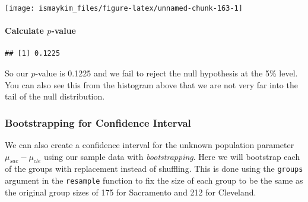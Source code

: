 \documentclass[]{tufte-book}
\newenvironment{Shaded}{\begin{snugshade}}{\end{snugshade}}
\newcommand{\KeywordTok}[1]{\textcolor[rgb]{0.13,0.29,0.53}{\textbf{{#1}}}}
\newcommand{\DataTypeTok}[1]{\textcolor[rgb]{0.13,0.29,0.53}{{#1}}}
\newcommand{\DecValTok}[1]{\textcolor[rgb]{0.00,0.00,0.81}{{#1}}}
\newcommand{\StringTok}[1]{\textcolor[rgb]{0.31,0.60,0.02}{{#1}}}
\newcommand{\OtherTok}[1]{\textcolor[rgb]{0.56,0.35,0.01}{{#1}}}
\newcommand{\NormalTok}[1]{{#1}}
\begin{document}
\begin{center}\texttt{[image: ismaykim\_files/figure-latex/unnamed-chunk-163-1]} \end{center}

\paragraph{\texorpdfstring{Calculate
\(p\)-value}{Calculate p-value}}\label{calculate-p-value-3}

\begin{Shaded}
\end{Shaded}

\begin{verbatim}
## [1] 0.1225
\end{verbatim}

So our \(p\)-value is 0.1225 and we fail to reject the null hypothesis
at the 5\% level. You can also see this from the histogram above that we
are not very far into the tail of the null distribution.

\subsubsection{Bootstrapping for Confidence
Interval}\label{bootstrapping-for-confidence-interval-3}

We can also create a confidence interval for the unknown population
parameter \(\mu_{sac} - \mu_{cle}\) using our sample data with
\emph{bootstrapping}. Here we will bootstrap each of the groups with
replacement instead of shuffling. This is done using the \texttt{groups}
argument in the \texttt{resample} function to fix the size of each group
to be the same as the original group sizes of 175 for Sacramento and 212
for Cleveland.

\begin{Shaded}
\end{Shaded}
\end{document}
